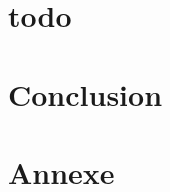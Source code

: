\documentclass[a4paper]{article}
\begin{document}
\clearpage

\section{todo}

\clearpage


\section{Conclusion}

\clearpage

\section{Annexe}
\end{document}
